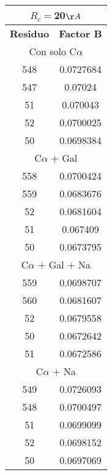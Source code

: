 \begin{tabular}[c]{|c|c|}
\multicolumn{2}{c}{$R_c=$20$\AA$}\\\hline
\textbf{Residuo}&\textbf{Factor B}\\\hline
\multicolumn{2}{c}{Con solo C$\alpha$}\\\hline
       548& 0.0727684\\
       547&   0.07024\\
        51&  0.070043\\
        52& 0.0700025\\
        50& 0.0698384\\\hline
\multicolumn{2}{c}{C$\alpha$ $+$ Gal}\\\hline
       558& 0.0700424\\
       559& 0.0683676\\
        52& 0.0681604\\
        51&  0.067409\\
        50& 0.0673795\\\hline
\multicolumn{2}{c}{C$\alpha$ $+$ Gal $+$ Na}\\\hline
       559& 0.0698707\\
       560& 0.0681607\\
        52& 0.0679558\\
        50& 0.0672642\\
        51& 0.0672586\\\hline
\multicolumn{2}{c}{C$\alpha$ $+$ Na}\\\hline
       549& 0.0726093\\
       548& 0.0700497\\
        51& 0.0699099\\
        52& 0.0698152\\
        50& 0.0697069\\\hline
\end{tabular}
